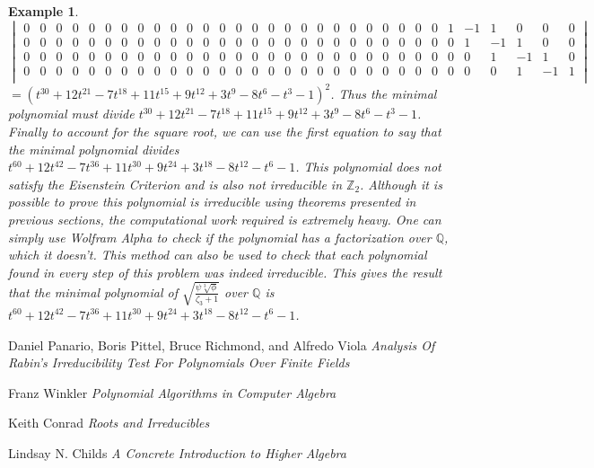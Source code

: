 \documentclass{article}
\newtheorem*{Definition: Sylvester Matrix}{Definition}
\newtheorem*{Definition: Resultant 1}{Definition 1}
\newtheorem*{Definition: Resultant 2}{Definition 2}
\newtheorem*{Theorem: Resultant proves shared roots}{Theorem 1}
\newtheorem*{Theorem: Minimal polynomial for beta}{Theorem 2}
\newtheorem*{Example: Sylvester Matrix Ex}{Example}
\newtheorem*{Theorem: Roots}{Theorem}
\newtheorem*{Corollary: Discriminant}{Corollary}
\newtheorem*{Theorem: Rational Root Theorem}{Theorem}
\newtheorem*{Corollary: Cubic Irreducibility}{Corollary}
\newtheorem*{Theorem: Eisenstein Criterion}{Theorem}
\newtheorem*{Theorem: mod p Test}{Theorem}
\newtheorem*{Theorem: Rabin's algorithm}{Theorem}
\newtheorem*{Theorem: gcd finite field}{Theorem}
\newtheorem*{Theorem: Gauss Irreducibles}{Theorem}
\newtheorem*{Theorem: Number of irreducibles}{Theorem}
\newtheorem*{Example: All irreducibles in Z_2}{Example}
\newtheorem*{Formula: Minimal polynomial for r root of a}{Formula 1}
\newtheorem*{Example: minimal polynomial for sqrt(p)}{Example}
\newtheorem*{Example: Golden Ratio}{Example}
\newtheorem*{Formula: Minimal polynomial for a+b}{Formula 2}
\newtheorem*{Example: 1 + sqrt(3)}{Example}
\newtheorem*{Example: cubic root of unity}{Example}
\newtheorem*{Formula: Minimal polynomial for a/b}{Formula 3}
\newtheorem*{Formula: Minimal polynomial for ab}{Formula 4}
\newtheorem*{Example: cubrt(4)/i+1}{Example}
\newtheorem*{Example: 5zeta}{Example}
\newtheorem*{Example: Wild one}{Example}
\begin{document}
\begin{Example: Wild one}
$$\begin{vmatrix}
 0 &  0 &  0 &  0 &  0 &  0 &  0 &  0 &  0 &  0 &  0 &  0 &  0 &  0 &  0 &  0 &  0 &  0 &  0 &  0 &  0 &  0 &  0 &  0 &  0 &  0 &  1 &  -1 &  1 &  0 &  0 &  0\\
 0 &  0 &  0 &  0 &  0 &  0 &  0 &  0 &  0 &  0 &  0 &  0 &  0 &  0 &  0 &  0 &  0 &  0 &  0 &  0 &  0 &  0 &  0 &  0 &  0 &  0 &  0 &  1 &  -1 &  1 &  0 &  0\\
 0 &  0 &  0 &  0 &  0 &  0 &  0 &  0 &  0 &  0 &  0 &  0 &  0 &  0 &  0 &  0 &  0 &  0 &  0 &  0 &  0 &  0 &  0 &  0 &  0 &  0 &  0 &  0 &  1 &  -1 &  1 &  0\\
 0 &  0 &  0 &  0 &  0 &  0 &  0 &  0 &  0 &  0 &  0 &  0 &  0 &  0 &  0 &  0 &  0 &  0 &  0 &  0 &  0 &  0 &  0 &  0 &  0 &  0 &  0 &  0 &  0 &  1 &  -1 &  1\\
 \end{vmatrix}$$
\normalsize
$= (t^{30} + 12t^{21}-7t^{18}+11t^{15}+9t^{12}+3t^9-8t^6-t^3-1)^2$. Thus the minimal polynomial must divide $t^{30} + 12t^{21}-7t^{18}+11t^{15}+9t^{12}+3t^9-8t^6-t^3-1$. Finally to account for the square root, we can use the first equation to say that the minimal polynomial divides $t^{60} + 12t^{42}-7t^{36}+11t^{30}+9t^{24}+3t^{18}-8t^{12}-t^6-1$. This polynomial does not satisfy the Eisenstein Criterion and is also not irreducible in $\mathbb{Z}_2$. Although it is possible to prove this polynomial is irreducible using theorems presented in previous sections, the computational work required is extremely heavy. One can simply use Wolfram Alpha to check if the polynomial has a factorization over $\mathbb{Q}$, which it doesn't. This method can also be used to check that each polynomial found in every step of this problem was indeed irreducible. This gives the result that the minimal polynomial of  $\sqrt{\frac{\psi \sqrt[3]{\phi}}{\zeta_3 + 1}}$ over $\mathbb{Q}$ is $t^{60} +       12t^{42}-7t^{36}+11t^{30}+9t^{24}+3t^{18}-8t^{12}-t^6-1$.
\end{Example: Wild one}

\begin{thebibliography}{9}
Daniel Panario, Boris Pittel, Bruce Richmond, and Alfredo Viola 
\textit{Analysis Of Rabin's Irreducibility Test For Polynomials Over Finite Fields} 

Franz Winkler 
\textit{Polynomial Algorithms in Computer Algebra}

Keith Conrad 
\textit{Roots and Irreducibles}

Lindsay N. Childs 
\textit{A Concrete Introduction to Higher Algebra}

\end{thebibliography}
\end{document}
